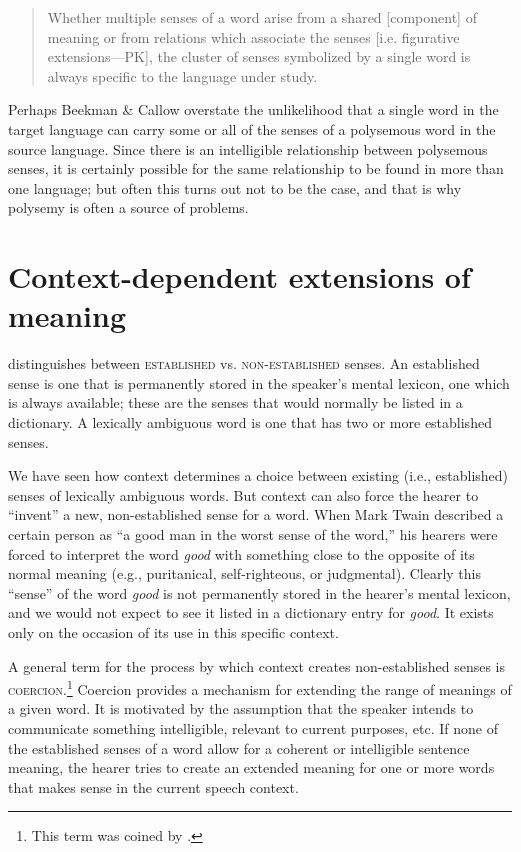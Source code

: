\begin{quote}
Whether multiple senses of a word arise from a shared [component] of meaning or from relations which associate the senses [i.e. figurative extensions—PK], the cluster of senses symbolized by a single word is always specific to the language under study.
\end{quote}


Perhaps Beekman \& Callow overstate the unlikelihood that a single word in the target language can carry some or all of the senses of a polysemous word in the source language. Since there is an intelligible relationship between polysemous senses, it is certainly possible for the same relationship to be found in more than one language; but often this turns out not to be the case, and that is why polysemy is often a source of problems.


\section{Context-dependent extensions of meaning}\label{sec:5.4}

\citet{Cruse1986,Cruse2000} distinguishes between \textsc{established} vs. \textsc{non-established} senses. An established sense is one that is permanently stored in the speaker’s mental lexicon, one which is always available; these are the senses that would normally be listed in a dictionary. A lexically ambiguous word is one that has two or more established senses.



We have seen how context determines a choice between existing (i.e., established) senses of lexically ambiguous words. But context can also force the hearer to “invent” a new, non-established sense for a word. When Mark Twain described a certain person as “a good man in the worst sense of the word,” his hearers were forced to interpret the word \textit{good} with something close to the opposite of its normal meaning (e.g., puritanical, self-righteous, or judgmental). Clearly this “sense” of the word \textit{good} is not permanently stored in the hearer’s mental lexicon, and we would not expect to see it listed in a dictionary entry for \textit{good}. It exists only on the occasion of its use in this specific context.



A general term for the process by which context creates non-established senses is \textsc{coercion}.\footnote{This term was coined by \citet{MoensSteedman1988}.} Coercion provides a mechanism for extending the range of meanings of a given word. It is motivated by the assumption that the speaker intends to communicate something intelligible, relevant to current purposes, etc. If none of the established senses of a word allow for a coherent or intelligible sentence meaning, the hearer tries to create an extended meaning for one or more words that makes sense in the current speech context.



